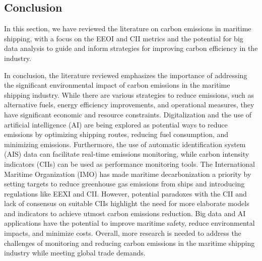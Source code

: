 \subsection{Conclusion}

In this section, we have reviewed the literature on carbon emissions in maritime shipping, with a focus on the EEOI and CII metrics and the potential for big data analysis to guide and inform strategies for improving carbon efficiency in the industry.

In conclusion, the literature reviewed emphasizes the importance of addressing the significant environmental impact of carbon emissions in the maritime shipping industry.
While there are various strategies to reduce emissions, such as alternative fuels, energy efficiency improvements, and operational measures, they have significant economic and resource constraints.
Digitalization and the use of artificial intelligence (AI) are being explored as potential ways to reduce emissions by optimizing shipping routes, reducing fuel consumption, and minimizing emissions.
Furthermore, the use of automatic identification system (AIS) data can facilitate real-time emissions monitoring, while carbon intensity indicators (CIIs) can be used as performance monitoring tools.
The International Maritime Organization (IMO) has made maritime decarbonization a priority by setting targets to reduce greenhouse gas emissions from ships and introducing regulations like EEXI and CII.
However, potential paradoxes with the CII and lack of consensus on suitable CIIs highlight the need for more elaborate models and indicators to achieve utmost carbon emissions reduction. Big data and AI applications have the potential to improve maritime safety, reduce environmental impacts, and minimize costs.
Overall, more research is needed to address the challenges of monitoring and reducing carbon emissions in the maritime shipping industry while meeting global trade demands.
